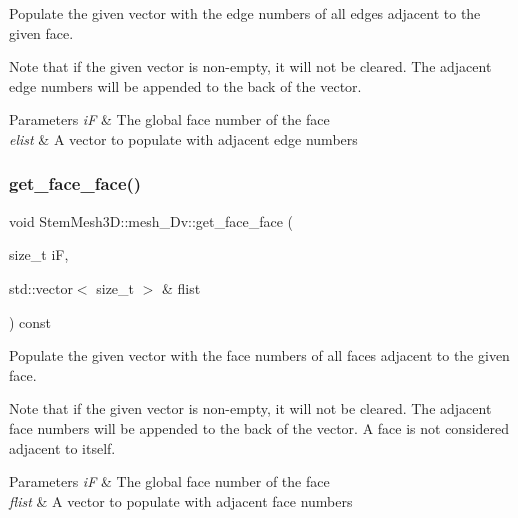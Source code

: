 Populate the given vector with the edge numbers of all edges adjacent to the given face. 

Note that if the given vector is non-\/empty, it will not be cleared. The adjacent edge numbers will be appended to the back of the vector. 
\begin{DoxyParams}{Parameters}
{\em iF} & The global face number of the face \\
\hline
{\em elist} & A vector to populate with adjacent edge numbers \\
\hline
\end{DoxyParams}
\mbox{\label{classStemMesh3D_1_1mesh__3Dv_ab505aac621d73bedfb3f7145ee857054}} 
\subsubsection{\texorpdfstring{get\+\_\+face\+\_\+face()}{get\_face\_face()}}
{\footnotesize\ttfamily void Stem\+Mesh3\+D\+::mesh\+\_\+Dv\+::get\+\_\+face\+\_\+face (\begin{DoxyParamCaption}\item[{size\+\_\+t}]{iF,  }\item[{std\+::vector$<$ size\+\_\+t $>$ \&}]{flist }\end{DoxyParamCaption}) const}



Populate the given vector with the face numbers of all faces adjacent to the given face. 

Note that if the given vector is non-\/empty, it will not be cleared. The adjacent face numbers will be appended to the back of the vector. A face is not considered adjacent to itself. 
\begin{DoxyParams}{Parameters}
{\em iF} & The global face number of the face \\
\hline
{\em flist} & A vector to populate with adjacent face numbers \\
\hline
\end{DoxyParams}
\mbox{\label{classStemMesh3D_1_1mesh__3Dv_ad44062545fdcb775a3cb83476750b1cd}} 
